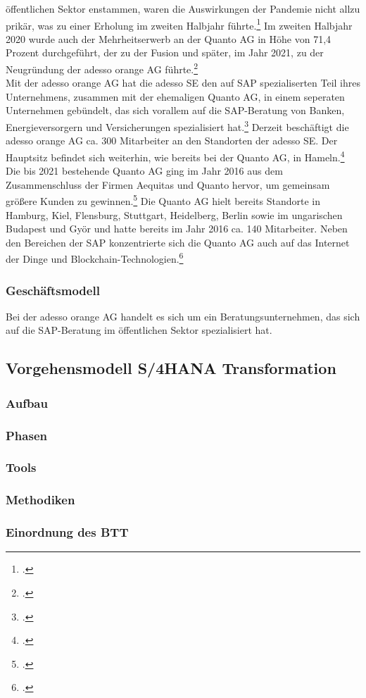 öffentlichen Sektor enstammen, waren die Auswirkungen der Pandemie nicht allzu prikär, was zu einer Erholung im zweiten Halbjahr führte.\footcite[Vgl.][S. 30f]{adesso2020-report} Im zweiten Halbjahr 2020 wurde auch der Mehrheitserwerb an der Quanto AG in Höhe von 71,4 Prozent durchgeführt, der zu der Fusion und später, im Jahr 2021, zu der Neugründung der adesso orange AG führte.\footcite[Vgl.][S. 15]{adesso2020-report} 
\\Mit der adesso orange AG hat die adesso SE den auf SAP spezialiserten Teil ihres Unternehmens, zusammen mit der ehemaligen Quanto AG, in einem seperaten Unternehmen gebündelt, das sich vorallem auf die SAP-Beratung von Banken, Energieversorgern und Versicherungen spezialisiert hat.\footcite[Vgl.][]{ao-main} Derzeit beschäftigt die adesso orange AG ca. 300 Mitarbeiter an den Standorten der adesso SE. Der Hauptsitz befindet sich weiterhin, wie bereits bei der Quanto AG, in Hameln.\footcite[Vgl.][]{ao-karriere}
Die bis 2021 bestehende Quanto AG ging im Jahr 2016 aus dem Zusammenschluss der Firmen \glqq{}Aequitas\grqq{} und \glqq{}Quanto\grqq{} hervor, um gemeinsam größere Kunden zu gewinnen.\footcite[Vgl.][]{ww-quanto} Die Quanto AG hielt bereits Standorte in Hamburg, Kiel, Flensburg, Stuttgart, Heidelberg, Berlin sowie im ungarischen Budapest und Györ und hatte bereits im Jahr 2016 ca. 140 Mitarbeiter. Neben den Bereichen der SAP konzentrierte sich die Quanto AG auch auf das \glqq{}Internet der Dinge\grqq{} und Blockchain-Technologien.\footcite[Vgl.][]{ww-quanto}

\subsubsection{Geschäftsmodell}
Bei der adesso orange AG handelt es sich um ein Beratungsunternehmen, das sich auf die SAP-Beratung im öffentlichen Sektor spezialisiert hat. 

\subsection{Vorgehensmodell S/4HANA Transformation}
\subsubsection{Aufbau}

\subsubsection{Phasen}

\subsubsection{Tools}

\subsubsection{Methodiken}

\subsubsection{Einordnung des BTT}